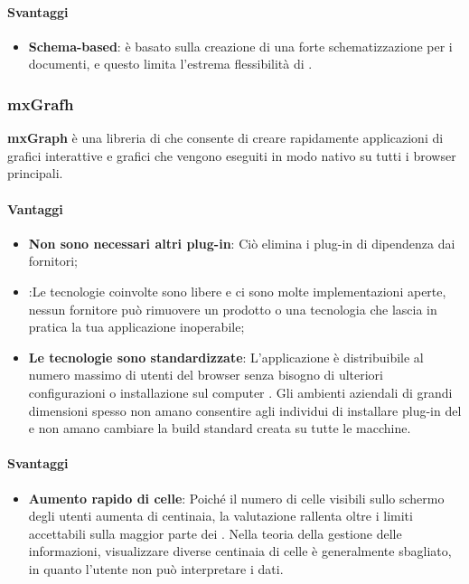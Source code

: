 \paragraph{Svantaggi}
\begin{itemize}
\item \textbf{Schema-based}: è basato sulla creazione di una forte schematizzazione per i
documenti, e questo limita l’estrema flessibilità di .
\end{itemize}

	\subsubsection{mxGrafh}
	\textbf{mxGraph} è una libreria  di  che consente di creare rapidamente applicazioni di grafici interattive e grafici che vengono eseguiti in modo nativo su tutti i browser principali.

\paragraph{Vantaggi}
\begin{itemize}
\item \textbf{Non sono necessari altri plug-in}: Ciò elimina i plug-in di dipendenza dai fornitori;
\item \textbf{}:Le tecnologie coinvolte sono libere e ci sono molte implementazioni aperte, nessun fornitore può rimuovere un prodotto o una tecnologia che lascia in pratica la tua applicazione inoperabile;
\item \textbf{Le tecnologie sono standardizzate}: L'applicazione è distribuibile al numero massimo di utenti del browser senza bisogno di ulteriori configurazioni o installazione sul computer . Gli ambienti aziendali di grandi dimensioni spesso non amano consentire agli individui di installare plug-in del  e non amano cambiare la build standard creata su tutte le macchine.
\end{itemize}

\paragraph{Svantaggi}
\begin{itemize}
\item \textbf{Aumento rapido di celle}: Poiché il numero di celle visibili sullo schermo degli utenti aumenta di centinaia, la valutazione rallenta oltre i limiti accettabili sulla maggior parte dei . Nella teoria della gestione delle informazioni, visualizzare diverse centinaia di celle è generalmente sbagliato, in quanto l'utente non può interpretare i dati. 
\end{itemize}